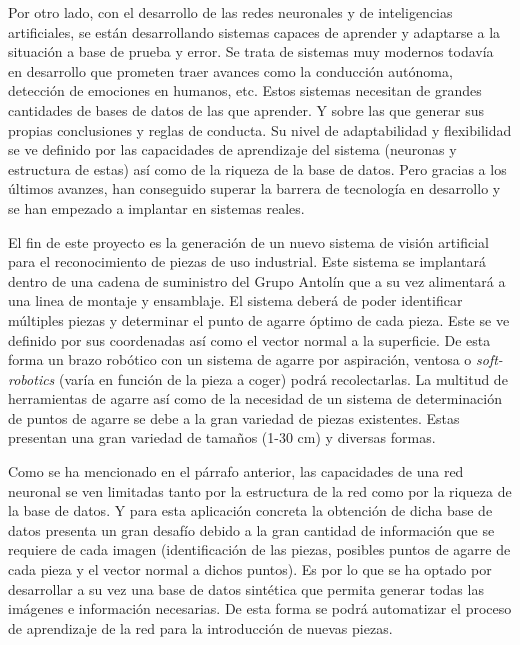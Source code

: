 Por otro lado, con el desarrollo de las redes neuronales y de inteligencias artificiales, se están desarrollando sistemas capaces de aprender y adaptarse a la situación a base de prueba y error. Se trata de sistemas muy modernos todavía en desarrollo que prometen traer avances como la conducción autónoma, detección de emociones en humanos, etc. Estos sistemas necesitan de grandes cantidades de bases de datos de las que aprender. Y sobre las que generar sus propias conclusiones y reglas de conducta. Su nivel de adaptabilidad y flexibilidad se ve definido por las capacidades de aprendizaje del sistema (neuronas y estructura de estas) así como de la riqueza de la base de datos. Pero gracias a los últimos avanzes, han conseguido superar la barrera de tecnología en desarrollo y se han empezado a implantar en sistemas reales.

El fin de este proyecto es la generación de un nuevo sistema de visión artificial para el reconocimiento de piezas de uso industrial. Este sistema se implantará dentro de una cadena de suministro del Grupo Antolín\textsuperscript{\textregistered} que a su vez alimentará a una linea de montaje y ensamblaje. El sistema deberá de poder identificar múltiples piezas y determinar el punto de agarre óptimo de cada pieza. Este se ve definido por sus coordenadas así como el vector normal a la superficie. De esta forma un brazo robótico con un sistema de agarre por aspiración, ventosa o \textit{soft-robotics} (varía en función de la pieza a coger) podrá recolectarlas. La multitud de herramientas de agarre así como de la necesidad de un sistema de determinación de puntos de agarre se debe a la gran variedad de piezas existentes. Estas presentan una gran variedad de tamaños (1-30 cm) y diversas formas.

Como se ha mencionado en el párrafo anterior, las capacidades de una red neuronal se ven limitadas tanto por la estructura de la red como por la riqueza de la base de datos. Y para esta aplicación concreta la obtención de dicha base de datos presenta un gran desafío debido a la gran cantidad de información que se requiere de cada imagen (identificación de las piezas, posibles puntos de agarre de cada pieza y el vector normal a dichos puntos). Es por lo que se ha optado por desarrollar a su vez una base de datos sintética que permita generar todas las imágenes e información necesarias. De esta forma se podrá automatizar el proceso de aprendizaje de la red para la introducción de nuevas piezas.

